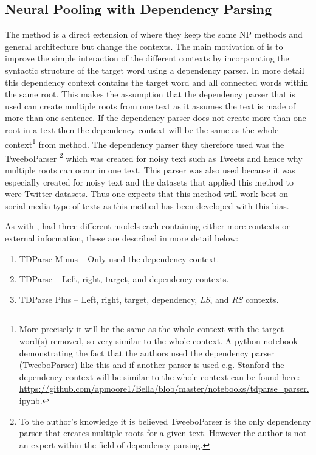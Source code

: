 \subsection{Neural Pooling with Dependency Parsing}
The \citet{wang-etal-2017-tdparse} method is a direct extension of \citet{vo2015target} where they keep the same NP methods and general architecture but change the contexts. The main motivation of \citet{wang-etal-2017-tdparse} is to improve the simple interaction of the different contexts by incorporating the syntactic structure of the target word using a dependency parser. In more detail this dependency context contains the target word and all connected words within the same root. This makes the assumption that the dependency parser that is used can create multiple roots from one text as it assumes the text is made of more than one sentence. If the dependency parser does not create more than one root in a text then the dependency context will be the same as the whole context\footnote{More precisely it will be the same as the whole context with the target word(s) removed, so very similar to the whole context. A python notebook demonstrating the fact that the authors used the dependency parser (TweeboParser) like this and if another parser is used e.g. Stanford the dependency context will be similar to the whole context can be found here: \url{https://github.com/apmoore1/Bella/blob/master/notebooks/tdparse\_parser.ipynb}.} from \citet{vo2015target} method. The dependency parser they therefore used was the TweeboParser \citep{kong-etal-2014-dependency}\footnote{To the author's knowledge it is believed TweeboParser is the only dependency parser that creates multiple roots for a given text. However the author is not an expert within the field of dependency parsing.} which was created for noisy text such as Tweets and hence why multiple roots can occur in one text. This parser was also used because it was especially created for noisy text and the datasets that \citet{wang-etal-2017-tdparse} applied this method to were Twitter datasets. Thus one expects that this method will work best on social media type of texts as this method has been developed with this bias.

As with \citet{vo2015target}, \citet{wang-etal-2017-tdparse} had three different models each containing either more contexts or external information, these are described in more detail below:

\begin{enumerate}
    \item TDParse Minus -- Only used the dependency context.
    \item TDParse -- Left, right, target, and dependency contexts.
    \item TDParse Plus -- Left, right, target, dependency, \textit{LS}, and \textit{RS} contexts.
\end{enumerate}

